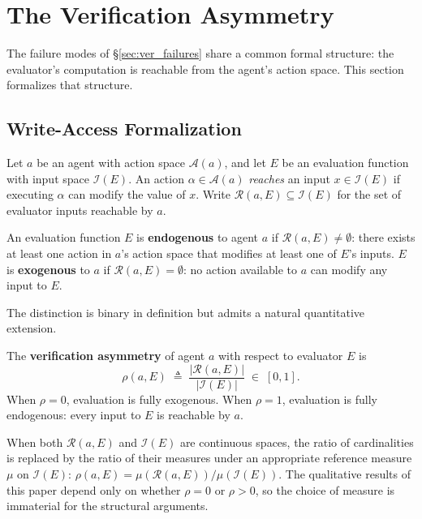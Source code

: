 \section{The Verification Asymmetry}
\label{sec:asymmetry}

The failure modes of \S\ref{sec:ver_failures} share a common formal
structure: the evaluator's computation is reachable from the agent's
action space.  This section formalizes that structure.

\subsection{Write-Access Formalization}
\label{sec:write_access}

Let $a$ be an agent with action space $\mathcal{A}(a)$, and let $E$ be
an evaluation function with input space $\mathcal{I}(E)$.  An action
$\alpha \in \mathcal{A}(a)$ \emph{reaches} an input $x \in
\mathcal{I}(E)$ if executing $\alpha$ can modify the value of $x$.
Write $\mathcal{R}(a, E) \subseteq \mathcal{I}(E)$ for the set of
evaluator inputs reachable by $a$.

\begin{definition}
\label{def:endo_exo}
An evaluation function $E$ is \textbf{endogenous} to agent $a$ if
$\mathcal{R}(a, E) \neq \emptyset$: there exists at least one action in
$a$'s action space that modifies at least one of $E$'s inputs.  $E$ is
\textbf{exogenous} to $a$ if $\mathcal{R}(a, E) = \emptyset$: no action
available to $a$ can modify any input to $E$.
\end{definition}

The distinction is binary in definition but admits a natural
quantitative extension.

\begin{definition}
\label{def:ver_asymmetry}
The \textbf{verification asymmetry} of agent $a$ with respect to
evaluator $E$ is
\[
    \rho(a, E) \;\triangleq\; \frac{|\mathcal{R}(a, E)|}{|\mathcal{I}(E)|}
    \;\in\; [0, 1].
\]
When $\rho = 0$, evaluation is fully exogenous.  When $\rho = 1$,
evaluation is fully endogenous: every input to $E$ is reachable by $a$.
\end{definition}

\begin{remark}
When both $\mathcal{R}(a, E)$ and $\mathcal{I}(E)$ are continuous
spaces, the ratio of cardinalities is replaced by the ratio of their
measures under an appropriate reference measure $\mu$ on $\mathcal{I}(E)$:
$\rho(a, E) = \mu(\mathcal{R}(a, E)) / \mu(\mathcal{I}(E))$.
The qualitative results of this paper depend only on whether $\rho = 0$
or $\rho > 0$, so the choice of measure is immaterial for the structural
arguments.
\end{remark}

